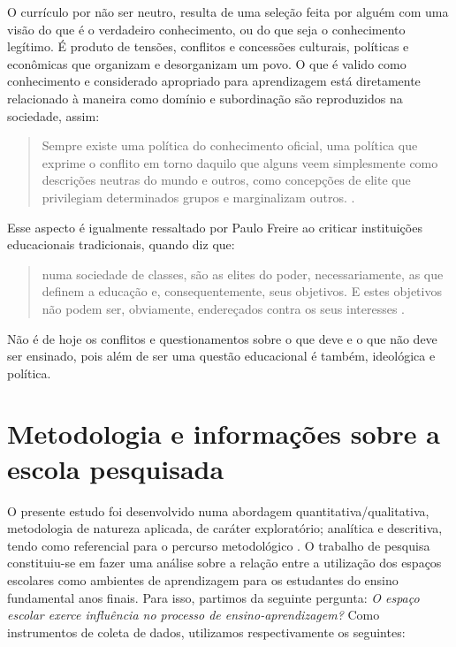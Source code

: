 \begin{refsection}
    O currículo por não ser neutro, resulta de uma seleção feita por alguém com uma visão do que é o verdadeiro conhecimento, ou do que seja o conhecimento legítimo. É produto de tensões, conflitos e concessões culturais, políticas e econômicas que organizam e desorganizam um povo. O que é valido como conhecimento e considerado apropriado para aprendizagem está diretamente relacionado à maneira como domínio e subordinação são reproduzidos na sociedade, assim: 

    \begin{quotation}
        Sempre existe uma política do conhecimento oficial, uma política que exprime o conflito em torno daquilo que alguns veem simplesmente como descrições neutras do mundo e outros, como concepções de elite que privilegiam determinados grupos e marginalizam outros. \cite{APPLE1992The}. 
    \end{quotation}

    Esse aspecto é igualmente ressaltado por Paulo Freire ao criticar instituições educacionais tradicionais, quando diz que: 

    \begin{quotation}
        numa sociedade de classes, são as elites do poder, necessariamente, as que definem a educação e, consequentemente, seus objetivos. E estes objetivos não podem ser, obviamente, endereçados contra os seus interesses \cite[FREIRE, 1976, p.~116, apud][p.~101]{BEISIEGEL2010Paulo}.
    \end{quotation}

    Não é de hoje os conflitos e questionamentos sobre o que deve e o que não deve ser ensinado, pois além de ser uma questão educacional é também, ideológica e política.  


    \section{Metodologia e informações sobre a escola pesquisada}

    O presente estudo foi desenvolvido numa abordagem quantitativa/qualitativa, metodologia de natureza aplicada, de caráter exploratório; analítica e descritiva, tendo como referencial para o percurso metodológico \textcite{LavilleAndDionne1999Construcao}. O trabalho de pesquisa constituiu-se em fazer uma análise sobre a relação entre a utilização dos espaços escolares como ambientes de aprendizagem para os estudantes do ensino fundamental anos finais. Para isso, partimos da seguinte pergunta: \textit{O espaço escolar exerce influência no processo de ensino-aprendizagem?} Como instrumentos de coleta de dados, utilizamos respectivamente os seguintes:


\end{refsection}
